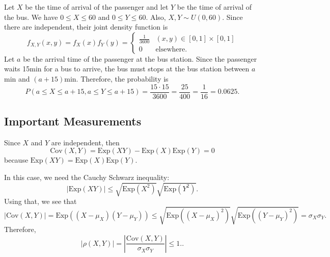 \begin{problem}
Let $X$ be the time of arrival of the passenger and let $Y$ be the time of arrival of the bus. We have $0 \leq X \leq 60$ and $0 \leq Y \leq 60$. Also, $X , Y \sim U (0, 60)$. Since there are independent, their joint density function is 
    \[
        f_{X, Y} (x, y) = f_X (x) f_Y (y) = \left\lbrace \begin{matrix} \frac{1}{3600} & (x, y) \in [0, 1] \times [0, 1] \\ 0 & \text{elsewhere} . \end{matrix} \right. 
    \]
Let $a$ be the arrival time of the passenger at the bus station. Since the passenger waits 15min for a bus to arrive, the bus must stops at the bus station between $a$min and $(a + 15)$min. Therefore, the probability is
    \[
        P (a \leq X \leq a + 15 , a \leq Y \leq a + 15 ) = \frac{15 \cdot 15}{3600} = \frac{25}{400} = \frac{1}{16} = 0.0625 . \tag*{$\square$}
    \]
\end{problem}


\subsection{Important Measurements}

\begin{problem}
Since $X$ and $Y$ are independent, then
    \[
        \mathrm{Cov} (X, Y) = \mathrm{Exp} (X Y) - \mathrm{Exp} (X) \mathrm{Exp} (Y) = 0
    \]
because $\mathrm{Exp} (XY) = \mathrm{Exp} (X) \mathrm{Exp} (Y)$.
\end{problem}

\begin{problem}
In this case, we need the Cauchy Schwarz inequality:
    \[
        |\mathrm{Exp} (XY)| \leq \sqrt{\mathrm{Exp} (X^2)} \sqrt{\mathrm{Exp} (Y^2)} .
    \]
Using that, we see that
    \[
        |\mathrm{Cov} (X, Y)| = \mathrm{Exp} ( (X - \mu_X ) (Y- \mu_Y)) \leq \sqrt{\mathrm{Exp} ( (X-\mu_X)^2)} \sqrt{\mathrm{Exp} ( (Y - \mu_Y)^2)} = \sigma_X \sigma_Y .
    \]
Therefore,
    \[
        |\rho (X, Y) | = \left| \frac{\mathrm{Cov} (X, Y)}{\sigma_X \sigma_Y} \right| \leq 1 . \tag*{$\square$}.
    \]
\end{problem}

